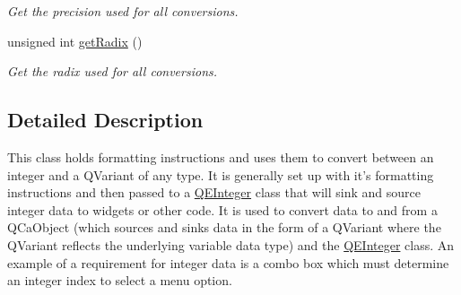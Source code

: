 \begin{DoxyCompactItemize}
\begin{DoxyCompactList}\small\item\em Get the precision used for all conversions. \end{DoxyCompactList}\item 
\hypertarget{classQEIntegerFormatting_a383f1e3375b08580d623fe6bbc58b145}{
unsigned int \hyperlink{classQEIntegerFormatting_a383f1e3375b08580d623fe6bbc58b145}{getRadix} ()}
\label{classQEIntegerFormatting_a383f1e3375b08580d623fe6bbc58b145}

\begin{DoxyCompactList}\small\item\em Get the radix used for all conversions. \end{DoxyCompactList}\end{DoxyCompactItemize}


\subsection{Detailed Description}
This class holds formatting instructions and uses them to convert between an integer and a QVariant of any type. It is generally set up with it's formatting instructions and then passed to a \hyperlink{classQEInteger}{QEInteger} class that will sink and source integer data to widgets or other code. It is used to convert data to and from a QCaObject (which sources and sinks data in the form of a QVariant where the QVariant reflects the underlying variable data type) and the \hyperlink{classQEInteger}{QEInteger} class. An example of a requirement for integer data is a combo box which must determine an integer index to select a menu option. 

